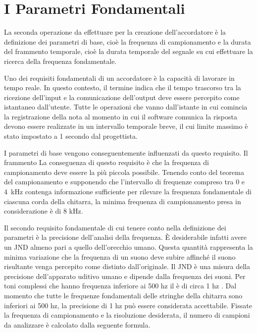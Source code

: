 \chapter{I Parametri Fondamentali}\label{cap:parametri}

La seconda operazione da effettuare per la creazione dell'accordatore è la definizione dei parametri di base, cioè la frequenza di campionamento e la durata del frammento temporale, cioè la durata temporale del segnale su cui effettuare la ricerca della frequenza fondamentale.  

Uno dei requisiti fondamentali di un accordatore è la capacità di lavorare in tempo reale. 
In questo contesto, il termine indica che il tempo trascorso tra la ricezione dell'input e la comunicazione dell'output deve essere percepito come istantaneo dall'utente. 
Tutte le operazioni che vanno dall'istante in cui comincia la registrazione della nota al momento in cui il software comunica la risposta devono essere realizzate in un intervallo temporale breve, il cui limite massimo è stato impostato a 1 secondo dal progettista. 

I parametri di base vengono conseguentemente influenzati da questo requisito.
Il frammento 
La conseguenza di questo requisito è che la frequenza di campionamento deve essere la più piccola possibile. 
Tenendo conto del teorema del campionamento e supponendo che l'intervallo di frequenze compreso tra 0 e \mbox{4 kHz} contenga informazione sufficiente per rilevare la frequenza fondamentale di ciascuna corda della chitarra, la minima frequenza di campionamento presa in considerazione è di 8 kHz.

Il secondo requisito fondamentale di cui tenere conto nella definizione dei parametri è la precisione dell'analisi della frequenza.
È desiderabile infatti avere un \mbox{JND} almeno pari a quello dell'orecchio umano. 
Questa quantità rappresenta la minima variazione che la frequenza di un suono deve subire affinché il suono risultante venga percepito come distinto dall'originale. 
Il \mbox{JND} è una misura della precisione dell'apparato uditivo umano e dipende dalla frequenza dei suoni.
Per toni complessi che hanno frequenza inferiore ai 500 hz il è di circa 1 hz . 
Dal momento che tutte le frequenze fondamentali delle stringhe della chitarra sono inferiori ai 500 hz, la precisione di 1 hz può essere considerata accettabile.
Fissate la frequenza di campionamento e la risoluzione desiderata, il numero di campioni da analizzare è calcolato dalla seguente formula.


